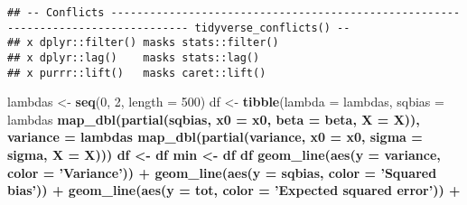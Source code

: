 \documentclass[]{article}
\newenvironment{Shaded}{\begin{snugshade}}{\end{snugshade}}
\newcommand{\KeywordTok}[1]{\textcolor[rgb]{0.13,0.29,0.53}{\textbf{#1}}}
\newcommand{\DataTypeTok}[1]{\textcolor[rgb]{0.13,0.29,0.53}{#1}}
\newcommand{\DecValTok}[1]{\textcolor[rgb]{0.00,0.00,0.81}{#1}}
\newcommand{\StringTok}[1]{\textcolor[rgb]{0.31,0.60,0.02}{#1}}
\newcommand{\OperatorTok}[1]{\textcolor[rgb]{0.81,0.36,0.00}{\textbf{#1}}}
\newcommand{\NormalTok}[1]{#1}
\begin{document}
\begin{verbatim}
## -- Conflicts ---------------------------------------------------------------------------------- tidyverse_conflicts() --
## x dplyr::filter() masks stats::filter()
## x dplyr::lag()    masks stats::lag()
## x purrr::lift()   masks caret::lift()
\end{verbatim}

\begin{Shaded}
\begin{Highlighting}[]
\NormalTok{lambdas <-}\StringTok{ }\KeywordTok{seq}\NormalTok{(}\DecValTok{0}\NormalTok{, }\DecValTok{2}\NormalTok{, }\DataTypeTok{length =} \DecValTok{500}\NormalTok{)}
\NormalTok{df <-}\StringTok{ }\KeywordTok{tibble}\NormalTok{(}\DataTypeTok{lambda =}\NormalTok{ lambdas,}
             \DataTypeTok{sqbias =}\NormalTok{ lambdas }\OperatorTok{%>%}
\StringTok{               }\KeywordTok{map_dbl}\NormalTok{(}\KeywordTok{partial}\NormalTok{(sqbias, }\DataTypeTok{x0 =}\NormalTok{ x0, }\DataTypeTok{beta =}\NormalTok{ beta, }\DataTypeTok{X =}\NormalTok{ X)),}
             \DataTypeTok{variance =}\NormalTok{ lambdas }\OperatorTok{%>%}
\StringTok{               }\KeywordTok{map_dbl}\NormalTok{(}\KeywordTok{partial}\NormalTok{(variance, }\DataTypeTok{x0 =}\NormalTok{ x0, }\DataTypeTok{sigma =}\NormalTok{ sigma, }\DataTypeTok{X =}\NormalTok{ X)))}
\NormalTok{df <-}\StringTok{ }\NormalTok{df }\OperatorTok{%>%}\StringTok{ }\KeywordTok{mutate}\NormalTok{(}\DataTypeTok{tot =}\NormalTok{ sqbias }\OperatorTok{+}\StringTok{ }\NormalTok{variance }\OperatorTok{+}\StringTok{ }\NormalTok{sigma}\OperatorTok{^}\DecValTok{2}\NormalTok{)}
\NormalTok{min <-}\StringTok{ }\NormalTok{df }\OperatorTok{%>%}\StringTok{ }\KeywordTok{filter}\NormalTok{(tot }\OperatorTok{==}\StringTok{ }\KeywordTok{min}\NormalTok{(tot)) }\OperatorTok{%>%}\StringTok{ }\KeywordTok{select}\NormalTok{(lambda, tot)}
\NormalTok{df }\OperatorTok{%>%}\StringTok{ }\KeywordTok{ggplot}\NormalTok{(}\KeywordTok{aes}\NormalTok{(}\DataTypeTok{x =}\NormalTok{ lambda)) }\OperatorTok{+}
\StringTok{  }\KeywordTok{geom_line}\NormalTok{(}\KeywordTok{aes}\NormalTok{(}\DataTypeTok{y =}\NormalTok{ variance, }\DataTypeTok{color =} \StringTok{'Variance'}\NormalTok{)) }\OperatorTok{+}
\StringTok{  }\KeywordTok{geom_line}\NormalTok{(}\KeywordTok{aes}\NormalTok{(}\DataTypeTok{y =}\NormalTok{ sqbias, }\DataTypeTok{color =} \StringTok{'Squared bias'}\NormalTok{)) }\OperatorTok{+}
\StringTok{  }\KeywordTok{geom_line}\NormalTok{(}\KeywordTok{aes}\NormalTok{(}\DataTypeTok{y =}\NormalTok{ tot, }\DataTypeTok{color =} \StringTok{'Expected squared error'}\NormalTok{)) }\OperatorTok{+}
}}}}}
\end{Highlighting}
\end{Shaded}
\end{document}
